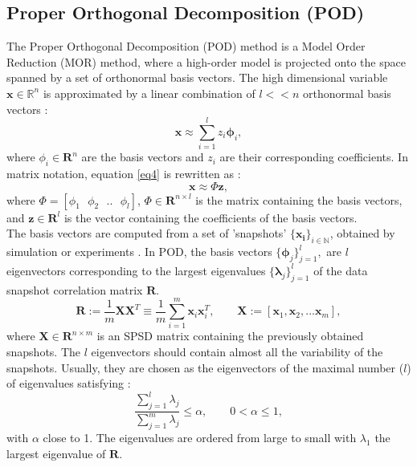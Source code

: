 \documentclass[12pt]{article}
\begin{document}
\subsection{Proper Orthogonal Decomposition (POD)}
\hspace{0.5cm}The Proper Orthogonal Decomposition (POD) 
method is a Model Order Reduction (MOR) method, where a high-order model is projected onto the space
spanned by a set of orthonormal basis vectors.
The high dimensional variable $\mathbf{x} \in \mathbb{R}^n$
is approximated by a linear combination of $l<<n$ orthonormal basis vectors \cite{Astrid11}:
\begin{equation}\label{eq4}
  \mathbf{x}\approx \sum_{i=1}^lz_i \mathbf{\phi}_i,
\end{equation}
where $\phi_i \in \mathbf{R}^n$ are the basis vectors and $z_i$ are their corresponding coefficients.
In matrix notation, equation \eqref{eq4} is rewritten as :
$$\mathbf{x}\approx \Phi\mathbf{z},$$
where $\Phi=[\phi_1 \text{ }\phi_2 \text{ }.. \text{ }\phi_l]$, $\Phi \in \mathbf{R}^{n\times l}$ 
is the matrix containing the basis vectors, and $\mathbf{z} \in \mathbf{R}^l$ is the vector 
containing the coefficients of the basis vectors. \\
The basis vectors are computed from a set of 'snapshots' $\{ \mathbf{x_i}\} _{i\in \mathbb{N}}$, 
obtained by simulation or experiments \cite{Mark06}. 
In POD, the basis vectors $\{ \mathbf{\phi} _j \} ^l _{j=1},$ are $l$ eigenvectors corresponding to 
the largest eigenvalues $\{ \mathbf{\lambda} _j \} ^l _{j=1}$ of the data snapshot correlation matrix $\mathbf{R}$.
\begin{equation}\label{eq:POD}
\mathbf{R}:= \frac{1}{m}\mathbf{X}\mathbf{X}^T \equiv \frac{1}{m} \sum_{i=1}^m \mathbf{x}_i \mathbf{x}_i^T,
\qquad \mathbf{X}:=[\mathbf{x}_1,\mathbf{x}_2,...\mathbf{x}_m],
\end{equation}
where $\mathbf{X}\in \mathbf{R}^{n\times m}$ is an SPSD matrix containing the previously obtained snapshots.
The $l$ eigenvectors should contain almost all the variability of the snapshots. 
Usually, they are chosen as the eigenvectors of the maximal number ($l$) of eigenvalues satisfying \cite{Mark06}:
\begin{equation}
\frac{\sum_{j=1}^l\lambda_j}{\sum_{j=1}^m\lambda_j}\leq \alpha, \qquad 0<\alpha \leq 1,
\end{equation}
with $\alpha$ close to 1. The eigenvalues are ordered from large to small with $\lambda_1$ 
the largest eigenvalue of $\mathbf{R}$.
\end{document}
